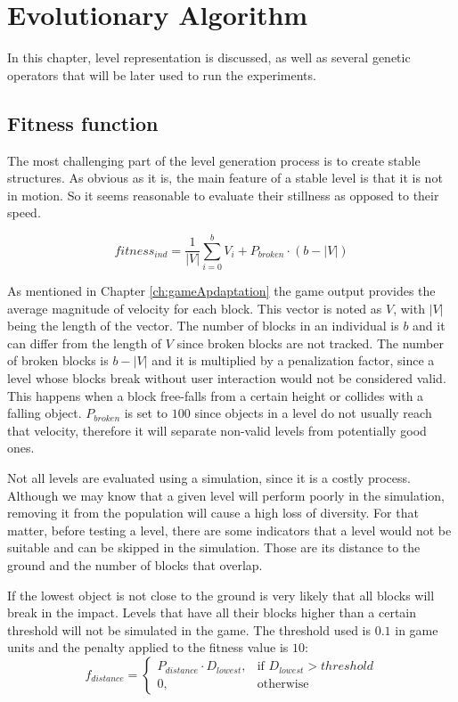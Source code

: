 \chapter{Evolutionary Algorithm}\label{ch:Representation}

In this chapter, level representation is discussed, as well as several genetic operators that will be later used to run the experiments. 

\section{Fitness function}

The most challenging part of the level generation process is to create stable structures. As obvious as it is, the main feature of a stable level is that it is not in motion. So it seems reasonable to evaluate their stillness as opposed to their speed.

$$fitness_{ind} = \frac{1}{|V|}\sum_{i=0}^{b}{V_i} + P_{broken}\cdot(b-|V|)$$

As mentioned in Chapter \ref{ch:gameApdaptation} the game output provides the average magnitude of velocity for each block. This vector is noted as $V$, with $|V|$ being the length of the vector. The number of blocks in an individual is $b$ and it can differ from the length of $V$ since broken blocks are not tracked. The number of broken blocks is $b-|V|$ and it is multiplied by a penalization factor, since a level whose blocks break without user interaction would not be considered valid. This happens when a block free-falls from a certain height or collides with a falling object. $P_{broken}$ is set to $100$ since objects in a level do not usually reach that velocity, therefore it will separate non-valid levels from potentially good ones.

Not all levels are evaluated using a simulation, since it is a costly process. Although we may know that a given level will perform poorly in the simulation, removing it from the population will cause a high loss of diversity. For that matter, before testing a level, there are some indicators that a level would not be suitable and can be skipped in the simulation. Those are its distance to the ground and the number of blocks that overlap.

If the lowest object is not close to the ground is very likely that all blocks will break in the impact. Levels that have all their blocks higher than a certain threshold will not be simulated in the game. The threshold used is $0.1$ in game units and the penalty applied to the fitness value is $10$:
$$f_{distance} =
\begin{cases}
P_{distance}\cdot D_{lowest},& \text{if } D_{lowest} > threshold\\
0,              & \text{otherwise}
\end{cases}
 $$


